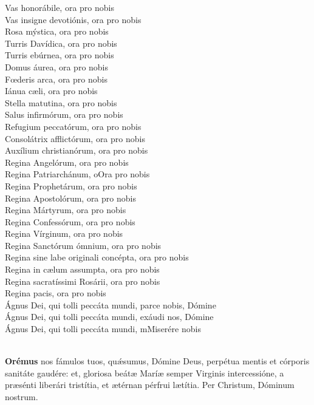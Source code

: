 \documentclass[9pt]{article}
\begin{document}
\begin{multicols*}{2}
    Vas honorábile, ora pro nobis\\
    Vas insigne devotiónis, ora pro nobis\\
    Rosa mýstica, ora pro nobis\\
    Turris Davídica, ora pro nobis\\
    Turris ebúrnea, ora pro nobis\\
    Domus áurea, ora pro nobis\\
    F{\oe}deris arca, ora pro nobis\\
    Iánua cæli, ora pro nobis\\
    Stella matutina, ora pro nobis\\
    Salus infirmórum, ora pro nobis\\
    Refugium peccatórum, ora pro nobis\\
    Consolátrix afflictórum, ora pro nobis\\
    Auxílium christianórum, ora pro nobis\\
    Regina Angelórum, ora pro nobis\\
    Regina Patriarchánum, oOra pro nobis\\
    Regina Prophetárum, ora pro nobis\\
    Regina Apostolórum, ora pro nobis\\
    Regina Mártyrum, ora pro nobis\\
    Regina Confessórum, ora pro nobis\\
    Regina Vírginum, ora pro nobis\\
    Regina Sanctórum ómnium, ora pro nobis\\
    Regina sine labe originali concépta, ora pro nobis\\
    Regina in c{\ae}lum assumpta, ora pro nobis\\
    Regina sacratíssimi Rosárii, ora pro nobis\\
    Regina pacis, ora pro nobis\\
    Ágnus Dei, qui tolli peccáta mundi, parce nobis, Dómine\\
    Ágnus Dei, qui tolli peccáta mundi, exáudi nos, Dómine\\
    Ágnus Dei, qui tolli peccáta mundi, mMiserére nobis\\
    \orapronobissalveinline\\

    \newpage

    \textbf{Orémus}
     nos fámulos tuos, qu{\'\ae}sumus, Dómine Deus, perpétua mentis et córporis sanitáte gaudére: et, gloriosa beát{\ae}
    Marí{\ae} semper Virginis intercessióne, a pr{\ae}sénti liberári tristítia, et {\ae}térnan pérfrui l{\ae}títia. Per Christum, Dóminum nostrum.
    \\


\end{multicols*}
\end{document}
